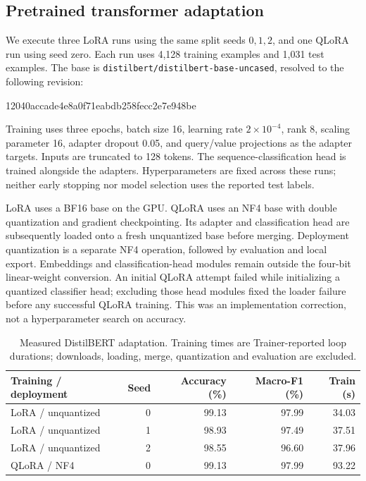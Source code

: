 \documentclass[11pt,a4paper]{article}
\newcommand{\code}[1]{\texttt{#1}}
\begin{document}
\subsection{Pretrained transformer adaptation}
We execute three LoRA runs using the same split seeds $0,1,2$, and one QLoRA
run using seed zero. Each run uses 4,128 training examples and 1,031 test
examples. The base is \code{distilbert/distilbert-base-uncased}, resolved to
the following revision:
\begin{center}\small\ttfamily
12040accade4e8a0f71eabdb258fecc2e7e948be
\end{center}
Training uses three
epochs, batch size 16, learning rate $2\times10^{-4}$, rank 8, scaling parameter
16, adapter dropout 0.05, and query/value projections as the adapter targets.
Inputs are truncated to 128 tokens. The sequence-classification head is trained
alongside the adapters. Hyperparameters are fixed across these runs; neither
early stopping nor model selection uses the reported test labels.

LoRA uses a BF16 base on the GPU. QLoRA uses an NF4 base with double
quantization and gradient checkpointing. Its adapter and classification head
are subsequently loaded onto a fresh unquantized base before merging.
Deployment quantization is a separate NF4 operation, followed by evaluation
and local export. Embeddings and classification-head modules remain outside
the four-bit linear-weight conversion. An initial QLoRA attempt failed while
initializing a quantized classifier head; excluding those head modules fixed
the loader failure before any successful QLoRA training. This was an
implementation correction, not a hyperparameter search on accuracy.

\begin{table}[ht]
\centering\small
\begin{tabular}{lrrrr}
\toprule
Training / deployment & Seed & Accuracy (\%) & Macro-F1 (\%) & Train (s) \\
\midrule
LoRA / unquantized & 0 & 99.13 & 97.99 & 34.03 \\
LoRA / unquantized & 1 & 98.93 & 97.49 & 37.51 \\
LoRA / unquantized & 2 & 98.55 & 96.60 & 37.96 \\
QLoRA / NF4 & 0 & 99.13 & 97.99 & 93.22 \\
\bottomrule
\end{tabular}
\caption{Measured DistilBERT adaptation. Training times are Trainer-reported
loop durations; downloads, loading, merge, quantization and evaluation are excluded.}
\label{tab:neural}
\end{table}
\end{document}
